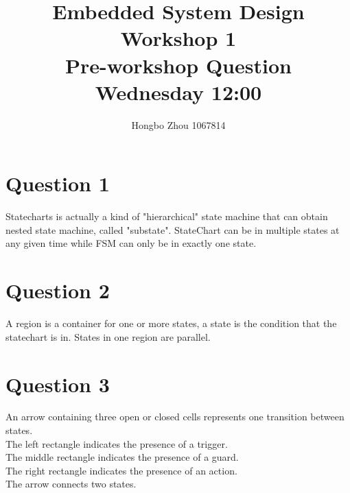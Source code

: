 \documentclass[12pt]{article}
\title{Embedded System Design Workshop 1\\
Pre-workshop Question \\
Wednesday 12:00}
\author{
    Hongbo Zhou 1067814
}
\date{}
\begin{document}
\maketitle 

\section*{Question 1}
Statecharts is actually a kind of "hierarchical" state machine that can obtain nested state machine, called "substate". 
StateChart can be in multiple states at any given time while FSM can only be in exactly one state.

\section*{Question 2}
A region is a container for one or more states, a state is the condition that the statechart is in. States in one region are parallel.

\section*{Question 3}
An arrow containing three open or closed cells represents one transition between states. \\
The left rectangle indicates the presence of a trigger.\\
The middle rectangle indicates the presence of a guard.\\
The right rectangle indicates the presence of an action.\\
The arrow connects two states.
\end{document}
